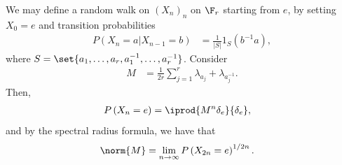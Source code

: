 \documentclass[10pt]{mypackage}
\begin{document}
We may define a random walk on $\left( X_n \right)_{n}$ on $\F_r$ starting from $e$, by setting $X_0 = e$ and transition probabilities
\begin{align*}
  P\left( X_n=a|X_{n-1}=b \right) &= \frac{1}{\left\vert S \right\vert} 1_{S}\left( b^{-1}a \right),
\end{align*}
where $S = \set{a_1,\dots,a_r,a_1^{-1},\dots,a_r^{-1}}$. Consider
\begin{align*}
  M &= \frac{1}{2r}\sum_{j=1}^{r}\lambda_{a_j} + \lambda_{a_j^{-1}}.
\end{align*}
Then,
\begin{align*}
  P\left( X_n = e \right) &= \iprod{M^{n}\delta_e}{\delta_e},
\end{align*}
and by the spectral radius formula, we have that
\begin{align*}
  \norm{M} &= \lim_{n\to\infty} P\left( X_{2n} = e \right)^{1/2n}.
\end{align*}
\end{document}
